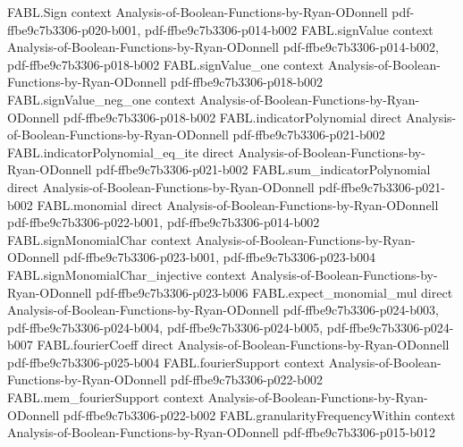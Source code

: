 \begin{theorem}
\label{FABL.deriv_stabilityCurve_one}
\leanok
{}
\proofstep
  {FABL.Sign}
  {context}
  {Analysis-of-Boolean-Functions-by-Ryan-ODonnell}
  {pdf-ffbe9c7b3306-p020-b001,
    pdf-ffbe9c7b3306-p014-b002}
\proofstep
  {FABL.signValue}
  {context}
  {Analysis-of-Boolean-Functions-by-Ryan-ODonnell}
  {pdf-ffbe9c7b3306-p014-b002,
    pdf-ffbe9c7b3306-p018-b002}
\proofstep
  {FABL.signValue_one}
  {context}
  {Analysis-of-Boolean-Functions-by-Ryan-ODonnell}
  {pdf-ffbe9c7b3306-p018-b002}
\proofstep
  {FABL.signValue_neg_one}
  {context}
  {Analysis-of-Boolean-Functions-by-Ryan-ODonnell}
  {pdf-ffbe9c7b3306-p018-b002}
\proofstep
  {FABL.indicatorPolynomial}
  {direct}
  {Analysis-of-Boolean-Functions-by-Ryan-ODonnell}
  {pdf-ffbe9c7b3306-p021-b002}
\proofstep
  {FABL.indicatorPolynomial_eq_ite}
  {direct}
  {Analysis-of-Boolean-Functions-by-Ryan-ODonnell}
  {pdf-ffbe9c7b3306-p021-b002}
\proofstep
  {FABL.sum_indicatorPolynomial}
  {direct}
  {Analysis-of-Boolean-Functions-by-Ryan-ODonnell}
  {pdf-ffbe9c7b3306-p021-b002}
\proofstep
  {FABL.monomial}
  {direct}
  {Analysis-of-Boolean-Functions-by-Ryan-ODonnell}
  {pdf-ffbe9c7b3306-p022-b001,
    pdf-ffbe9c7b3306-p014-b002}
\proofstep
  {FABL.signMonomialChar}
  {context}
  {Analysis-of-Boolean-Functions-by-Ryan-ODonnell}
  {pdf-ffbe9c7b3306-p023-b001,
    pdf-ffbe9c7b3306-p023-b004}
\proofstep
  {FABL.signMonomialChar_injective}
  {context}
  {Analysis-of-Boolean-Functions-by-Ryan-ODonnell}
  {pdf-ffbe9c7b3306-p023-b006}
\proofstep
  {FABL.expect_monomial_mul}
  {direct}
  {Analysis-of-Boolean-Functions-by-Ryan-ODonnell}
  {pdf-ffbe9c7b3306-p024-b003,
    pdf-ffbe9c7b3306-p024-b004,
    pdf-ffbe9c7b3306-p024-b005,
    pdf-ffbe9c7b3306-p024-b007}
\proofstep
  {FABL.fourierCoeff}
  {direct}
  {Analysis-of-Boolean-Functions-by-Ryan-ODonnell}
  {pdf-ffbe9c7b3306-p025-b004}
\proofstep
  {FABL.fourierSupport}
  {context}
  {Analysis-of-Boolean-Functions-by-Ryan-ODonnell}
  {pdf-ffbe9c7b3306-p022-b002}
\proofstep
  {FABL.mem_fourierSupport}
  {context}
  {Analysis-of-Boolean-Functions-by-Ryan-ODonnell}
  {pdf-ffbe9c7b3306-p022-b002}
\proofstep
  {FABL.granularityFrequencyWithin}
  {context}
  {Analysis-of-Boolean-Functions-by-Ryan-ODonnell}
  {pdf-ffbe9c7b3306-p015-b012}

\end{theorem}
